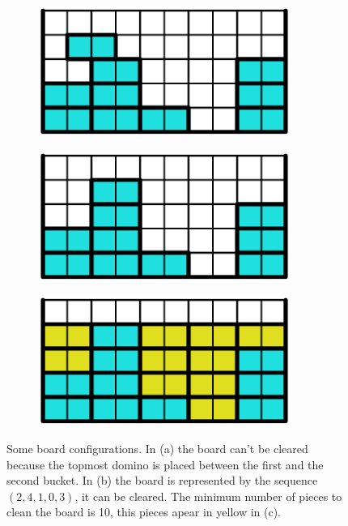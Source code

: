 \begin{figure}[ht]
  \centering
  \begin{subfigure}[b]{0.3\textwidth}
    \centering
    \includegraphics[width=0.9\textwidth]{pictures/dominoes/horitzonatl_configuration_1.pdf}
    \caption{}
  \end{subfigure}
  \begin{subfigure}[b]{0.3\textwidth}
    \centering
    \includegraphics[width=0.9\textwidth]{pictures/dominoes/horitzonatl_configuration_2.pdf}
    \caption{}
  \end{subfigure}
  \begin{subfigure}[b]{0.3\textwidth}
    \centering
    \includegraphics[width=0.9\textwidth]{pictures/dominoes/horitzonatl_configuration_3.pdf}
    \caption{}
  \end{subfigure}
  \caption{Some board configurations. In (a) the board can't be cleared because the topmost domino is placed between the first and the second bucket. In (b) the board is represented by the sequence $(2,4,1,0,3)$, it can be cleared. The minimum number of pieces to clean the board is 10, this pieces apear in yellow in (c).}
  \label{dom:horitzonatl_configuration}
\end{figure}

